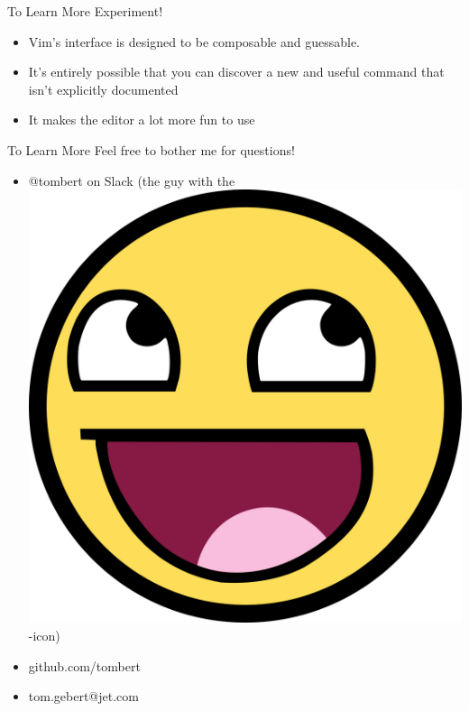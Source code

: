 \documentclass{beamer}
\begin{document}
\begin{frame}{To Learn More}
	Experiment!
	\begin{itemize}
		\item Vim's interface is designed to be composable and guessable.  
		\item It's entirely possible that you can discover a new and useful command that isn't explicitly documented
		\item It makes the editor a lot more fun to use
	\end{itemize}
\end{frame}

\begin{frame}{To Learn More}
	Feel free to bother me for questions!  
	\begin{itemize}
		\item @tombert on Slack (the guy with the \includegraphics[scale=.006]{awesome.jpg}-icon)
		\item github.com/tombert
		\item tom.gebert@jet.com
	\end{itemize}
\end{frame}
\end{document}
